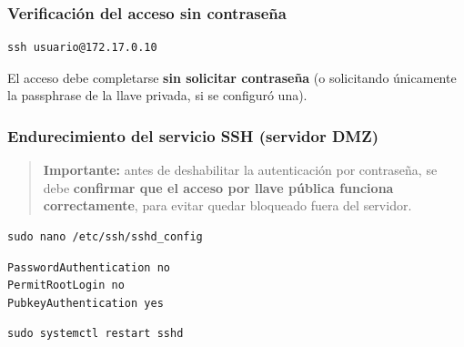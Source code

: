 \documentclass{article}
\renewcommand{\_}{\oldunderscore\hskip0pt\relax}
\begin{document}
\hypertarget{verificaciuxf3n-del-acceso-sin-contraseuxf1a}{%
\subsubsection{Verificación del acceso sin
contraseña}\label{verificaciuxf3n-del-acceso-sin-contraseuxf1a}}

\begin{Verbatim}[fontsize=\footnotesize,frame=single,rulecolor=\color{codebg},fillcolor=\color{codebg},framesep=2mm,xleftmargin=1mm,xrightmargin=1mm,breaklines=true,breakanywhere=true,breaksymbolleft={},breaksymbolright={}]
ssh usuario@172.17.0.10
\end{Verbatim}

El acceso debe completarse \textbf{sin solicitar contraseña} (o
solicitando únicamente la passphrase de la llave privada, si se
configuró una).

\hypertarget{endurecimiento-del-servicio-ssh-servidor-dmz}{%
\subsubsection{Endurecimiento del servicio SSH (servidor
DMZ)}\label{endurecimiento-del-servicio-ssh-servidor-dmz}}

\begin{quote}
\textbf{Importante:} antes de deshabilitar la autenticación por
contraseña, se debe \textbf{confirmar que el acceso por llave pública
funciona correctamente}, para evitar quedar bloqueado fuera del
servidor.
\end{quote}

\begin{Verbatim}[fontsize=\footnotesize,frame=single,rulecolor=\color{codebg},fillcolor=\color{codebg},framesep=2mm,xleftmargin=1mm,xrightmargin=1mm,breaklines=true,breakanywhere=true,breaksymbolleft={},breaksymbolright={}]
sudo nano /etc/ssh/sshd_config
\end{Verbatim}

\begin{Verbatim}[fontsize=\footnotesize,frame=single,rulecolor=\color{codebg},fillcolor=\color{codebg},framesep=2mm,xleftmargin=1mm,xrightmargin=1mm,breaklines=true,breakanywhere=true,breaksymbolleft={},breaksymbolright={}]
PasswordAuthentication no
PermitRootLogin no
PubkeyAuthentication yes
\end{Verbatim}

\begin{Verbatim}[fontsize=\footnotesize,frame=single,rulecolor=\color{codebg},fillcolor=\color{codebg},framesep=2mm,xleftmargin=1mm,xrightmargin=1mm,breaklines=true,breakanywhere=true,breaksymbolleft={},breaksymbolright={}]
sudo systemctl restart sshd
\end{Verbatim}
\end{document}
